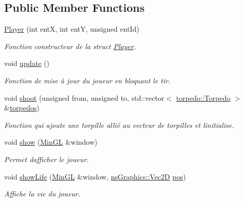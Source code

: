 \subsection*{Public Member Functions}
\begin{DoxyCompactItemize}
\item 
\hyperlink{structplayer_1_1_player_aea13d1e63bb4216dd7bb8ed925e9c058}{Player} (int entX, int entY, unsigned ent\+Id)
\begin{DoxyCompactList}\small\item\em Fonction constructeur de la struct \hyperlink{structplayer_1_1_player}{Player}. \end{DoxyCompactList}\item 
void \hyperlink{structplayer_1_1_player_a8a9a40b3c690c1edf7146b1f7132cd64}{update} ()
\begin{DoxyCompactList}\small\item\em Fonction de mise à jour du joueur en bloquant le tir. \end{DoxyCompactList}\item 
void \hyperlink{structplayer_1_1_player_a2a9b25a631e616ff91cb6ec815f9990a}{shoot} (unsigned from, unsigned to, std\+::vector$<$ \hyperlink{structtorpedo_1_1_torpedo}{torpedo\+::\+Torpedo} $>$ \&\hyperlink{multi_8cpp_a8d978ee3afff71f0b07f921403c2b403}{torpedos})
\begin{DoxyCompactList}\small\item\em Fonction qui ajoute une torpille allié au vecteur de torpilles et l\textquotesingle{}initialise. \end{DoxyCompactList}\item 
void \hyperlink{structplayer_1_1_player_a3f3f5a529fd56346902ca83672640294}{show} (\hyperlink{class_min_g_l}{Min\+GL} \&window)
\begin{DoxyCompactList}\small\item\em Permet d\textquotesingle{}afficher le joueur. \end{DoxyCompactList}\item 
void \hyperlink{structplayer_1_1_player_a26d56b47474cb89219f2aed8d92878d7}{show\+Life} (\hyperlink{class_min_g_l}{Min\+GL} \&window, \hyperlink{classns_graphics_1_1_vec2_d}{ns\+Graphics\+::\+Vec2D} \hyperlink{structplayer_1_1_player_aec9e16b6c6306f2ce5bfceec6210cb44}{pos})
\begin{DoxyCompactList}\small\item\em Affiche la vie du joueur. \end{DoxyCompactList}\end{DoxyCompactItemize}
